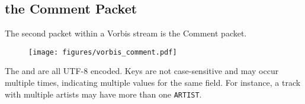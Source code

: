 \clearpage

\subsection{the Comment Packet}
\label{vorbiscomment}
The second packet within a Vorbis stream is the Comment packet.

\begin{figure}[h]
\texttt{[image: figures/vorbis\_comment.pdf]}
\end{figure}

The  and  are all UTF-8 encoded.
Keys are not case-sensitive and may occur multiple times,
indicating multiple values for the same field.
For instance, a track with multiple artists may have
more than one \texttt{ARTIST}.

